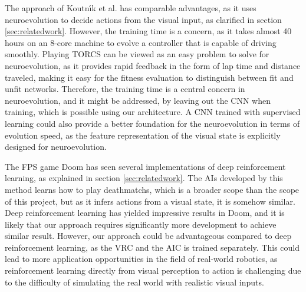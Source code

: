 The approach of Koutn\'{\i}k et al.\cite{torcs} has comparable advantages, as it uses neuroevolution to decide actions from the visual input, as clarified in section \ref{sec:relatedwork}. However, the training time is a concern, as it takes almost 40 hours on an 8-core machine to evolve a controller that is capable of driving smoothly. Playing TORCS can be viewed as an easy problem to solve for neuroevolution, as it provides rapid feedback in the form of lap time and distance traveled, making it easy for the fitness evaluation to distinguish between fit and unfit networks. Therefore, the training time is a central concern in neuroevolution, and it might be addressed, by leaving out the CNN when training, which is possible using our architecture. A CNN trained with supervised learning could also provide a better foundation for the neuroevolution in terms of evolution speed, as the feature representation of the visual state is explicitly designed for neuroevolution.

The FPS game Doom has seen several implementations of deep reinforcement learning, as explained in section \ref{sec:relatedwork}. The AIs developed by this method learns how to play deathmatchs, which is a broader scope than the scope of this project, but as it infers actions from a visual state, it is somehow similar. Deep reinforcement learning has yielded impressive results in Doom, and it is likely that our approach requires significantly more development to achieve similar result. However, our approach could be advantageous compared to deep reinforcement learning, as the VRC and the AIC is trained separately. This could lead to more application opportunities in the field of real-world robotics, as reinforcement learning directly from visual perception to action is challenging due to the difficulty of simulating the real world with realistic visual inputs.

